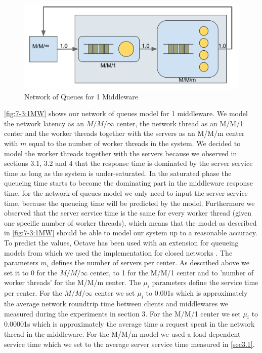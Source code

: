 \documentclass[11pt,a4paper]{article}
\begin{document}
\begin{figure}[H]
    \includegraphics[width=.5\linewidth]{plots/NetworkOfQueues1MW.pdf}
    \caption{Network of Queues for 1 Middleware}
    \label{fig:7-3:1MW}
\end{figure}
\autoref{fig:7-3:1MW} shows our network of queues model for 1 middleware. We model the network latency as an $M/M/\infty$ center, the network thread as an M/M/1 center and the worker threads together with the servers as an M/M/m center with $m$ equal to the number of worker threads in the system. We decided to model the worker threads together with the servers because we observed in sections 3.1, 3.2 and 4 that the response time is dominated by the server service time as long as the system is under-saturated. In the saturated phase the queueing time starts to become the dominating part in the middleware response time, for the network of queues model we only need to input the server service time, because the queueing time will be predicted by the model. Furthermore we observed that the server service time is the same for every worker thread (given one specific number of worker threads), which means that the model as described in \autoref{fig:7-3:1MW} should be able to model our system up to a reasonable accuracy. To predict the values, Octave \cite{octave} has been used with an extension for queueing models from which we used the implementation for closed networks \cite[ch. 5.2.2]{queueingLib}. The parameters $m_i$ defines the number of servers per center. As described above we set it to 0 for the $M/M/\infty$ center, to 1 for the M/M/1 center and to 'number of worker threads' for the M/M/m center.
The $\mu_i$ parameters define the service time per center. For the $M/M/\infty$ center we set $\mu_i$ to 0.001s which is approximately the average network roundtrip time between clients and middlewares we measured during the experiments in section 3. For the M/M/1 center we set $\mu_i$ to 0.00001s which is approximately the average time a request spent in the network thread in the middleware.
For the M/M/m model we used a load dependent service time which we set to the average server service time measured in \autoref{sec3.1}.
\end{document}
